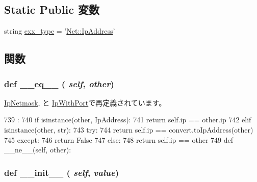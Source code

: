 \subsection*{Static Public 変数}
\begin{DoxyCompactItemize}
\item 
string \hyperlink{classm5_1_1params_1_1IpAddress_a2f1553ebb79374a68b36fdd6d8d82fc3}{cxx\_\-type} = '\hyperlink{structNet_1_1IpAddress}{Net::IpAddress}'
\end{DoxyCompactItemize}


\subsection{関数}
\hypertarget{classm5_1_1params_1_1IpAddress_a449f8fd74d358c0ad641b6c6d6917ba0}{
\subsubsection[{\_\-\_\-eq\_\-\_\-}]{\setlength{\rightskip}{0pt plus 5cm}def \_\-\_\-eq\_\-\_\- ( {\em self}, \/   {\em other})}}
\label{classm5_1_1params_1_1IpAddress_a449f8fd74d358c0ad641b6c6d6917ba0}


\hyperlink{classm5_1_1params_1_1IpNetmask_a449f8fd74d358c0ad641b6c6d6917ba0}{IpNetmask}, と \hyperlink{classm5_1_1params_1_1IpWithPort_a449f8fd74d358c0ad641b6c6d6917ba0}{IpWithPort}で再定義されています。


\begin{DoxyCode}
739                            :
740         if isinstance(other, IpAddress):
741             return self.ip == other.ip
742         elif isinstance(other, str):
743             try:
744                 return self.ip == convert.toIpAddress(other)
745             except:
746                 return False
747         else:
748             return self.ip == other
749 
    def __ne__(self, other):
\end{DoxyCode}
\hypertarget{classm5_1_1params_1_1IpAddress_ac775ee34451fdfa742b318538164070e}{
\subsubsection[{\_\-\_\-init\_\-\_\-}]{\setlength{\rightskip}{0pt plus 5cm}def \_\-\_\-init\_\-\_\- ( {\em self}, \/   {\em value})}}
\label{classm5_1_1params_1_1IpAddress_ac775ee34451fdfa742b318538164070e}



